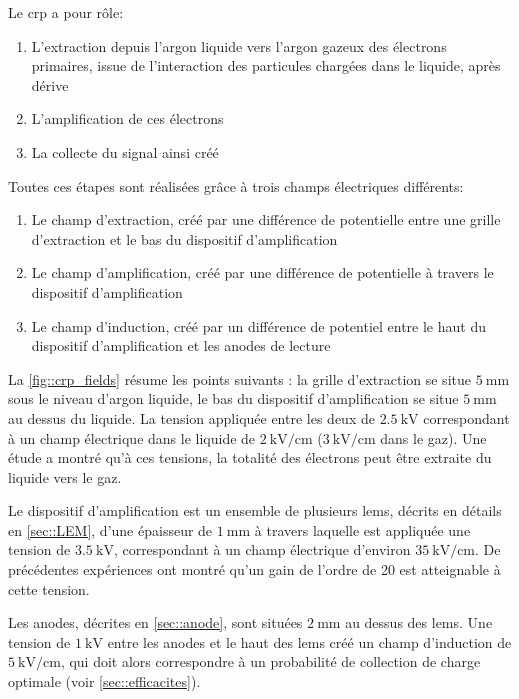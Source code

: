             Le \gls{crp} a pour rôle:
            \begin{enumerate}
                \item L'extraction depuis l'argon liquide vers l'argon gazeux des électrons primaires, issue de l'interaction des particules chargées dans le liquide, après dérive
                \item L'amplification de ces électrons
                \item La collecte du signal ainsi créé
            \end{enumerate}
            Toutes ces étapes sont réalisées grâce à trois champs électriques différents:
            \begin{enumerate}
                \item Le champ d'extraction, créé par une différence de potentielle entre une grille d'extraction et le bas du dispositif d'amplification
                \item Le champ d'amplification, créé par une différence de potentielle à travers le dispositif d'amplification
                \item Le champ d'induction, créé par un différence de potentiel entre le haut du dispositif d'amplification et les anodes de lecture
            \end{enumerate}
            La \autoref{fig::crp_fields} résume les points suivants : la grille d'extraction se situe $\SI{5}{\milli\meter}$ sous le niveau d'argon liquide, le bas du dispositif d'amplification se situe $\SI{5}{\milli\meter}$ au dessus du liquide. La tension appliquée entre les deux de $\SI{2.5}{\kilo\volt}$ correspondant à un champ électrique dans le liquide de $\SI{2}{\kilo\volt\per\centi\meter}$ ($\SI{3}{\kilo\volt\per\centi\meter}$ dans le gaz). Une étude \cite{guschin} a montré qu'à ces tensions, la totalité des électrons peut être extraite du liquide vers le gaz.
            
            Le dispositif d'amplification est un ensemble de plusieurs \glspl{lem}, décrits en détails en \autoref{sec::LEM}, d'une épaisseur de $\SI{1}{\milli\meter}$ à travers laquelle est appliquée une tension de $\SI{3.5}{\kilo\volt}$, correspondant à un champ électrique d'environ $\SI{35}{\kilo\volt\per\centi\meter}$. De précédentes expériences \cite{Badertscher2011,Cantini2014} ont montré qu'un gain de l'ordre de 20 est atteignable à cette tension.
            
            Les anodes, décrites en \autoref{sec::anode}, sont situées $\SI{2}{\milli\meter}$ au dessus des \glspl{lem}. Une tension de $\SI{1}{\kilo\volt}$ entre les anodes et le haut des \glspl{lem} créé un champ d'induction de $\SI{5}{\kilo\volt\per\centi\meter}$, qui doit alors correspondre à un probabilité de collection de charge optimale (voir \autoref{sec::efficacites}).
            
